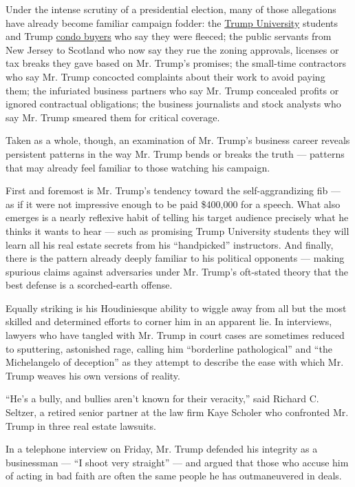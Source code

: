 Under the intense scrutiny of a presidential election, many of those
allegations have already become familiar campaign fodder: the
\href{http://www.nytimes3xbfgragh.onion/2016/06/01/us/politics/donald-trump-university.html}{Trump
University} students and Trump
\href{http://www.nytimes3xbfgragh.onion/2016/04/06/us/politics/donald-trump-soho-settlement.html}{condo
buyers} who say they were fleeced; the public servants from New Jersey
to Scotland who now say they rue the zoning approvals, licenses or tax
breaks they gave based on Mr. Trump's promises; the small-time
contractors who say Mr. Trump concocted complaints about their work to
avoid paying them; the infuriated business partners who say Mr. Trump
concealed profits or ignored contractual obligations; the business
journalists and stock analysts who say Mr. Trump smeared them for
critical coverage.

Taken as a whole, though, an examination of Mr. Trump's business career
reveals persistent patterns in the way Mr. Trump bends or breaks the
truth --- patterns that may already feel familiar to those watching his
campaign.

First and foremost is Mr. Trump's tendency toward the self-aggrandizing
fib --- as if it were not impressive enough to be paid \$400,000 for a
speech. What also emerges is a nearly reflexive habit of telling his
target audience precisely what he thinks it wants to hear --- such as
promising Trump University students they will learn all his real estate
secrets from his ``handpicked'' instructors. And finally, there is the
pattern already deeply familiar to his political opponents --- making
spurious claims against adversaries under Mr. Trump's oft-stated theory
that the best defense is a scorched-earth offense.

Equally striking is his Houdiniesque ability to wiggle away from all but
the most skilled and determined efforts to corner him in an apparent
lie. In interviews, lawyers who have tangled with Mr. Trump in court
cases are sometimes reduced to sputtering, astonished rage, calling him
``borderline pathological'' and ``the Michelangelo of deception'' as
they attempt to describe the ease with which Mr. Trump weaves his own
versions of reality.

``He's a bully, and bullies aren't known for their veracity,'' said
Richard C. Seltzer, a retired senior partner at the law firm Kaye
Scholer who confronted Mr. Trump in three real estate lawsuits.

In a telephone interview on Friday, Mr. Trump defended his integrity as
a businessman --- ``I shoot very straight'' --- and argued that those
who accuse him of acting in bad faith are often the same people he has
outmaneuvered in deals.

